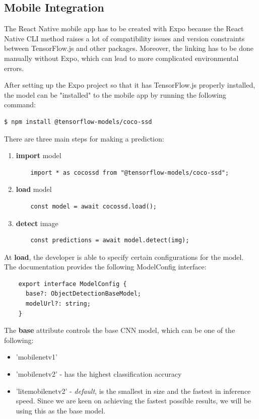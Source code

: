 \documentclass[runningheads,a4paper,11pt]{report}
\begin{document}
\subsection{Mobile Integration}
\label{section:mobileIntegration}

The React Native mobile app has to be created with Expo because the React Native CLI method raises a lot of compatibility issues and version constraints between TensorFlow.js and other packages. Moreover, the linking has to be done manually without Expo, which can lead to more complicated environmental errors. 


After setting up the Expo project so that it has TensorFlow.js properly installed, the model can be "installed" to the mobile app by running the following command:

\begin{lstlisting}[language=bash]
    $ npm install @tensorflow-models/coco-ssd
\end{lstlisting}
There are three main steps for making a prediction:
\begin{enumerate}
  \item \textbf{import} model
  \begin{lstlisting}
    import * as cocossd from "@tensorflow-models/coco-ssd";
  \end{lstlisting}
  \item \textbf{load} model
  \begin{lstlisting}
    const model = await cocossd.load();
  \end{lstlisting}
  \item \textbf{detect} image
  \begin{lstlisting}
    const predictions = await model.detect(img);
  \end{lstlisting}
\end{enumerate}
At \textbf{load}, the developer is able to specify certain configurations for the model. The documentation provides the following ModelConfig interface: 
    \begin{lstlisting}
    export interface ModelConfig {
      base?: ObjectDetectionBaseModel;
      modelUrl?: string;
    }
    \end{lstlisting}
The \textbf{base} attribute controls the base CNN model, which can be one of the following:
\begin{itemize}
  \item 'mobilenet\textunderscore v1' 
  \item 'mobilenet\textunderscore v2' - has the highest classification accuracy
  \item 'lite\textunderscore mobilenet\textunderscore v2' - \textit{default}, is the smallest in size and the fastest in inference speed. Since we are keen on achieving the fastest possible results, we will be using this as the base model.
\end{itemize}
\end{document}
